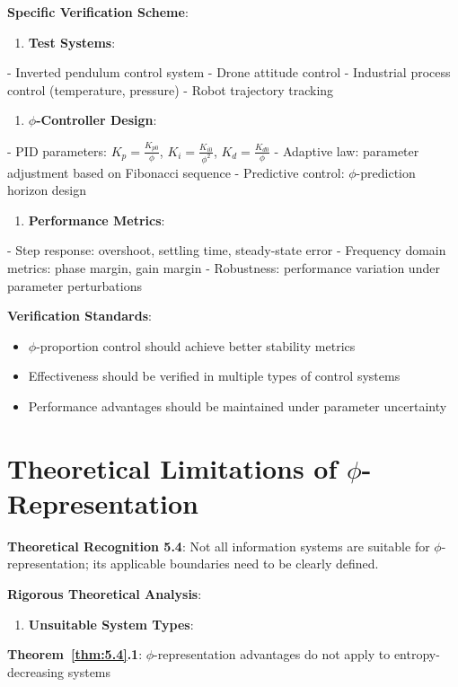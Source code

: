 \textbf{Specific Verification Scheme}:
\begin{enumerate}
\item \textbf{Test Systems}:
\end{enumerate}
   - Inverted pendulum control system
   - Drone attitude control
   - Industrial process control (temperature, pressure)
   - Robot trajectory tracking

\begin{enumerate}
\item \textbf{$\phi$-Controller Design}:
\end{enumerate}
   - PID parameters: $K_p = \frac{K_{p0}}{\phi}$, $K_i = \frac{K_{i0}}{\phi^2}$, $K_d = \frac{K_{d0}}{\phi}$
   - Adaptive law: parameter adjustment based on Fibonacci sequence
   - Predictive control: $\phi$-prediction horizon design

\begin{enumerate}
\item \textbf{Performance Metrics}:
\end{enumerate}
   - Step response: overshoot, settling time, steady-state error
   - Frequency domain metrics: phase margin, gain margin
   - Robustness: performance variation under parameter perturbations

\textbf{Verification Standards}:
\begin{itemize}
\item $\phi$-proportion control should achieve better stability metrics
\item Effectiveness should be verified in multiple types of control systems
\item Performance advantages should be maintained under parameter uncertainty
\end{itemize}

\section{Theoretical Limitations of $\phi$-Representation}
\label{sec:ch07_applications:theoretical-limitations-of-phi-representation}

\textbf{Theoretical Recognition 5.4}: Not all information systems are suitable for $\phi$-representation; its applicable boundaries need to be clearly defined.

\textbf{Rigorous Theoretical Analysis}:

\begin{enumerate}
\item \textbf{Unsuitable System Types}:
\end{enumerate}
   \textbf{Theorem~\ref{thm:5.4}.1}: $\phi$-representation advantages do not apply to entropy-decreasing systems
\label{thm:5.4}
   

